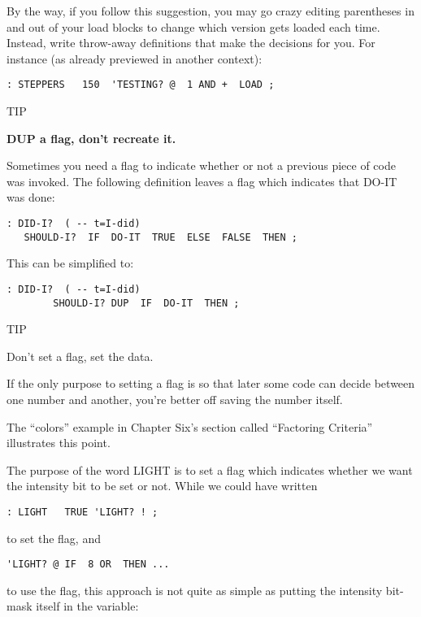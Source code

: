 By the way, if you follow this suggestion, you may go crazy editing
parentheses in and out of your load blocks to change which version gets
loaded each time. Instead, write throw-away definitions that make the
decisions for you. For instance (as already previewed in another context):

\begin{verbatim}
: STEPPERS   150  'TESTING? @  1 AND +  LOAD ;
\end{verbatim}

TIP

\bf{DUP} a flag, don't recreate it.

Sometimes you need a flag to indicate whether or not a previous piece of
code was invoked. The following definition leaves a flag which indicates
that DO-IT was done:

\begin{verbatim}
: DID-I?  ( -- t=I-did)
   SHOULD-I?  IF  DO-IT  TRUE  ELSE  FALSE  THEN ;
\end{verbatim}

This can be simplified to:

\begin{verbatim}
: DID-I?  ( -- t=I-did)
        SHOULD-I? DUP  IF  DO-IT  THEN ;
\end{verbatim}

TIP

Don't set a flag, set the data.

If the only purpose to setting a flag is so that later some code can decide
between one number and another, you're better off saving the number
itself.

The ``colors'' example in Chapter Six's section called ``Factoring
Criteria'' illustrates this point.

The purpose of the word LIGHT is to set a flag which indicates
whether we want the intensity bit to be set or not. While we could have
written

\begin{verbatim}
: LIGHT   TRUE 'LIGHT? ! ;
\end{verbatim}

to set the flag, and

\begin{verbatim}
'LIGHT? @ IF  8 OR  THEN ...
\end{verbatim}

to use the flag, this approach is not quite as simple as putting the
intensity bit-mask itself in the variable:

